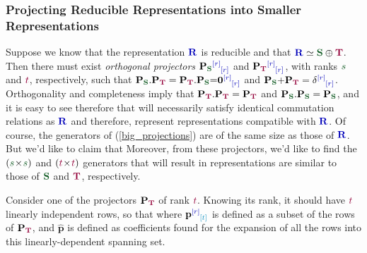 \documentclass[12pt,a4paper]{article}\let\ifpdf\relax
\begin{document}
\subsubsection[Projecting Representations into Smaller Representations]{Projecting Reducible Representations into Smaller Representations}\vspace{-4pt}

Suppose we know that the representation $\mathbf{\b{R}}$ is reducible and that  $\mathbf{\b{R}}\simeq\mathbf{\g{S}}\oplus\mathbf{\r{T}}$. Then there must exist \emph{orthogonal projectors} $\mathbf{P}_{\mathbf{\g{S}}}\indices{\b{[r]}}{\b{[r]}}$ and $\mathbf{P}_{\mathbf{\r{T}}}\indices{\b{[r]}}{\b{[r]}}$, with ranks $\g{s}$ and $\r{t}$, respectively, such that $\mathbf{P}_{\mathbf{\g{S}}}.\mathbf{P}_{\mathbf{\r{T}}}=\mathbf{P}_{\mathbf{\r{T}}}.\mathbf{P}_{\mathbf{\g{S}}}{=}\mathbf{0}\indices{\b{[r]}}{\b{[r]}}$ and $\mathbf{P}_{\mathbf{\g{S}}}{+}\mathbf{P}_{\mathbf{\r{T}}}=\delta\indices{\b{[r]}}{\b{[r]}}$. Orthogonality and completeness imply that $\mathbf{P}_{\mathbf{\r{T}}}.\mathbf{P}_{\mathbf{\r{T}}}=\mathbf{P}_{\mathbf{\r{T}}}$ and $\mathbf{P}_{\mathbf{\g{S}}}.\mathbf{P}_{\mathbf{\g{S}}}=\mathbf{P}_{\mathbf{\g{S}}}$, and it is easy to see therefore that 
%
%
will necessarily satisfy identical commutation relations as $\mathbf{\b{R}}$ and therefore, represent representations compatible with $\mathbf{\b{R}}$. Of course, the generators of (\ref{big_projections}) are of the same size as those of $\mathbf{\b{R}}$. But we'd like to claim that 
%
%
Moreover, from these projectors, we'd like to find the $(\g{s}\!\times\!\g{s})$ and $(\r{t}\!\times\!\r{t})$ generators that will result in representations are similar to those of $\mathbf{\g{S}}$ and $\mathbf{\r{T}}$, respectively. 

Consider one of the projectors $\mathbf{P}_{\mathbf{\r{T}}}$ of rank $\r{t}$. Knowing its rank, it should have $\r{t}$ linearly independent rows, so that 
%
%
where $\mathbf{p}\indices{\b{[r]}}{\t{[t]}}$ is defined as a subset of the rows of $\mathbf{P}_{\mathbf{\r{T}}}$, and $\mathbf{\hat{p}}$ is defined as coefficients found for the expansion of all the rows into this linearly-dependent spanning set.
\end{document}
